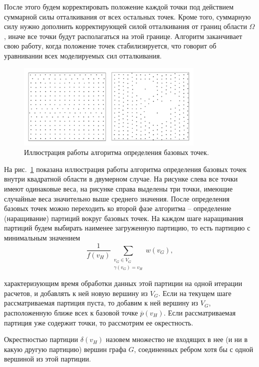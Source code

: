 После этого будем корректировать положение каждой точки под действием суммарной силы отталкивания от всех остальных точек.
Кроме того, суммарную силу нужно дополнить корректирующей силой отталкивания от границ области $\Omega$, иначе все точки будут располагаться на этой границе.
Алгоритм заканчивает свою работу, когда положение точек стабилизируется, что говорит об уравнивании всех моделируемых сил отталкивания.

\begin{figure}[ht]
\centering
\includegraphics[width=0.8\textwidth]{./pics/text_2_getero/rvp.pdf}
\caption{Иллюстрация работы алгоритма определения базовых точек.}
\label{fig:text_2_getero_rvp}
\end{figure}

На рис.~\ref{fig:text_2_getero_rvp} показана иллюстрация работы алгоритма определения базовых точек внутри квадратной области в двумерном случае.
На рисунке слева все точки имеют одинаковые веса, на рисунке справа выделены три точки, имеющие случайные веса значительно выше среднего значения.
После определения базовых точек можно переходить ко второй фазе алгоритма -- определение (наращивание) партиций вокруг базовых точек.
На каждом шаге наращивания партиций будем выбирать наименее загруженную партицию, то есть партицию с минимальным значением
\begin{equation}
	\frac{1}{f(v_H)} \sum_{\substack{v_G \in V_G \\ \gamma(v_G) = v_H}}{w(v_G)},
\end{equation}

характеризующим время обработки данных этой партиции на одной итерации расчетов, и добавлять к ней новую вершину из $V_G$.
Если на текущем шаге рассматриваемая партиция пуста, то добавим к ней вершину из $V_G$, расположенную ближе всех к базовой точке $\overline{p}(v_H)$.
Если рассматриваемая партиция уже содержит точки, то рассмотрим ее окрестность.

\begin{definition}
Окрестностью партиции $\delta(v_H)$ назовем множество не входящих в нее (и ни в какую другую партицию) вершин графа $G$, соединенных ребром хотя бы с одной вершиной из этой партиции.
\end{definition}

